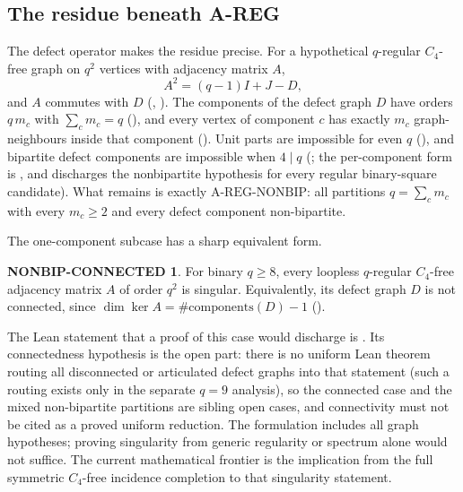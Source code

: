 \documentclass{anvil-paper}
\newcommand{\NONBIP}{\mathrm{A\text{-}REG\text{-}NONBIP}}
\theoremstyle{definition}
\newtheorem*{nonbipconn}{NONBIP-CONNECTED}
\begin{document}
\subsection{The residue beneath A-REG}\label{sec:residue}

The defect operator makes the residue precise. For a hypothetical $q$-regular $C_4$-free graph on $q^2$ vertices with adjacency matrix $A$,
\[
A^2=(q-1)I+J-D,
\]
and $A$ commutes with $D$ (, ). The components of the defect graph $D$ have orders $q\,m_c$ with $\sum_c m_c=q$ (), and every vertex of component $c$ has exactly $m_c$ graph-neighbours inside that component (). Unit parts are impossible for even $q$ (), and bipartite defect components are impossible when $4\mid q$ (; the per-component form is , and  discharges the nonbipartite hypothesis for every regular binary-square candidate). What remains is exactly $\NONBIP$: all partitions $q=\sum_c m_c$ with every $m_c\ge 2$ and every defect component non-bipartite.

The one-component subcase has a sharp equivalent form.

\begin{nonbipconn}
For binary $q\ge 8$, every loopless $q$-regular $C_4$-free adjacency matrix $A$ of order $q^2$ is singular. Equivalently, its defect graph $D$ is not connected, since $\dim\ker A=\#\mathrm{components}(D)-1$ ().
\end{nonbipconn}

The Lean statement that a proof of this case would discharge is . Its connectedness hypothesis is the open part: there is no uniform Lean theorem routing all disconnected or articulated defect graphs into that statement (such a routing exists only in the separate $q=9$ analysis), so the connected case and the mixed non-bipartite partitions are sibling open cases, and connectivity must not be cited as a proved uniform reduction. The formulation includes all graph hypotheses; proving singularity from generic regularity or spectrum alone would not suffice. The current mathematical frontier is the implication from the full symmetric $C_4$-free incidence completion to that singularity statement.
\end{document}
